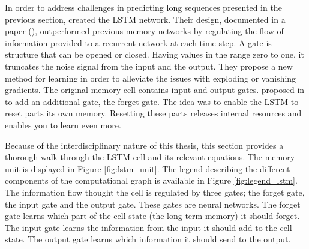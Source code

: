 In order to address challenges in predicting long sequences presented in the previous section, \citeauthor{Hochreiter1997LongMemory} created the LSTM network. Their design, documented in a \citeyear{Hochreiter1997LongMemory} paper (\cite{Hochreiter1997LongMemory}), outperformed previous memory networks by regulating the flow of information provided to a recurrent network at each time step.
A gate is structure that can be opened or closed. Having values in the range zero to one, it truncates the noise signal from the input and the output. They propose a new method for learning %
in order to alleviate the issues with exploding or vanishing gradients. The original memory cell contains input and output gates. \citeauthor{lstm_learning_to_forget} proposed in \citeyear{lstm_learning_to_forget} to add an additional gate, the forget gate. The idea was to enable the LSTM to reset parts its own memory. Resetting these parts releases internal resources and enables you to learn even more. 

Because of the interdisciplinary nature of this thesis, this section provides a thorough walk through the LSTM cell and its relevant equations. The memory unit is displayed in Figure \ref{fig:lstm_unit}. The legend describing the different components of the computational graph is available in Figure \ref{fig:legend_lstm}. The information flow thought the cell is regulated by three gates; the forget gate, the input gate and the output gate. These gates are neural networks. The forget gate learns which part of the cell state (the long-term memory) it should forget. The input gate learns the information from the input it should add to the cell state. The output gate learns which information it should send to the output. 

